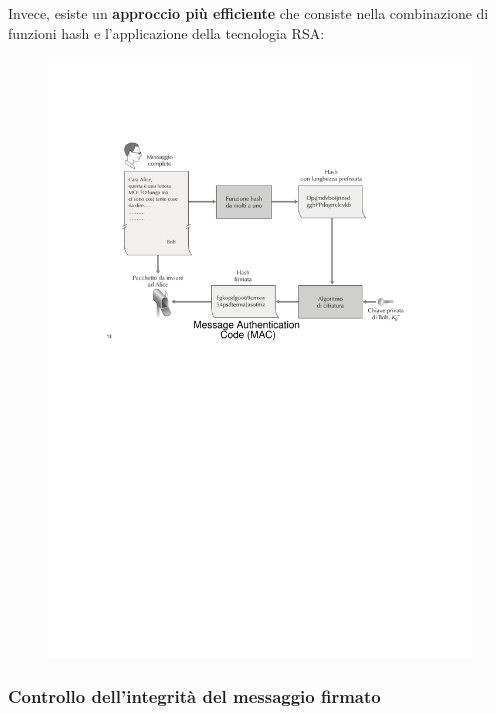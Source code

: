 \documentclass[a4paper]{article}
\begin{document}
	\noindent
	Invece, esiste un \textbf{approccio più efficiente} che consiste nella combinazione di funzioni hash e l'applicazione della tecnologia RSA:
	\begin{figure}[!htp]
		\centering
		\includegraphics[width=\textwidth]{img/int-aut_e_autor/firma_documento-ottimizzato.pdf}
	\end{figure}\newpage
	
	\subsubsection{Controllo dell'integrità del messaggio firmato}
	
\end{document}
